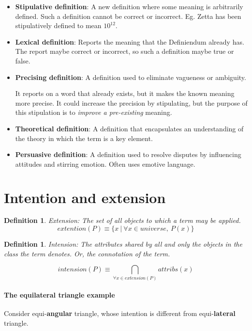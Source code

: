 \documentclass[5pt]{book}
\newtheorem{definition}[theorem]{Definition}
\begin{document}
\begin{itemize}
    \item \textbf{Stipulative definition}: A new definition where some meaning is
        arbitrarily defined. Such a definition cannot be correct or incorrect.
        Eg. Zetta has been stipulatively defined to mean $10^{12}$.
    \item \textbf{Lexical definition}: Reports the meaning that the Definiendum
        already has. The report maybe correct or incorrect, so such a definition
        maybe true or false.
    \item \textbf{Precising definition}: A definition used to eliminate 
        vagueness or ambiguity.

        It reports on a word that already exists, but it makes the known
        meaning more precise. It could increase the precision by stipulating,
        but the purpose of this stipulation is to \textit{improve a pre-existing}
        meaning.

    \item \textbf{Theoretical definition}: A definition that encapsulates
        an understanding of the theory in which the term is a key element.
    \item \textbf{Persuasive definition}: A definition used to resolve
        disputes  by influencing attitudes and stirring emotion. Often
        uses emotive language.
\end{itemize}

\section{Intention and extension}
\begin{definition} Extension: The set of all objects to which a term
    may be applied. $$extention(P) \equiv \{ x ~|~\forall x \in universe, ~P(x) \}$$
\end{definition}

\begin{definition} Intension: The attributes shared by all and only the objects
    in the class the term denotes. Or, the connotation of the term.

    $$intension(P) \equiv \bigcap_{\forall x \in extension(P)} attribs(x) $$
\end{definition}

\paragraph{The equilateral triangle example} 
Consider equi-\textbf{angular} triangle,
whose intention is different from equi-\textbf{lateral} triangle.
\end{document}
